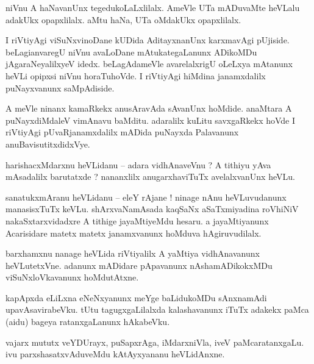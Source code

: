 \documentclass{article}
\begin{document}
\begin{mn}%
niVnu A haNavanUnx tegedukoLaLxlilalx. AmeVle UTa mADuvaMte heVLalu adakUkx opapxlilalx. aMtu haNa, 
UTa oMdakUkx opapxlilalx.
\end{mn}

\begin{mn}%
I riVtiyAgi viSuNxvinoDane kUDida AditayxnanUnx karxmavAgi pUjiside. beLagianvaregU niVnu avaLoDane 
mAtukategaLanunx ADikoMDu jAgaraNeyalilxyeV idedx. beLagAdameVle avarelalxrigU oLeLxya mAtanunx 
heVLi opipxsi niVnu horaTuhoVde. I riVtiyAgi hiMdina janamxdalilx puNayxvanunx saMpAdiside.
\end{mn}

\begin{mn}%
A meVle ninanx kamaRkekx anusAravAda sAvanUnx hoMdide. anaMtara A puNayxdiMdaleV vimAnavu baMditu. 
adaralilx kuLitu savxgaRkekx hoVde I riVtiyAgi pUvaRjanamxdalilx mADida puNayxda Palavanunx 
anuBavisutitxdidxVye.
\end{mn}

\begin{mn}%
harishacxMdarxnu heVLidanu -- adara vidhAnaveVnu ? A tithiyu yAva mAsadalilx barutatxde ? 
nananxlilx anugarxhaviTuTx avelalxvanUnx heVLu.
\end{mn}

\begin{mn}%
sanatukxmAranu heVLidanu -- eleY rAjane ! ninage nAnu heVLuvudanunx manasisxTuTx keVLu. 
shArxvaNamAsada kaqSaNx aSaTxmiyadina roVhiNiV nakaSxtarxvidadxre A tithige jayaMtiyeMdu hesaru. a 
jayaMtiyanunx Acarisidare matetx matetx janamxvanunx hoMduva hAgiruvudilalx.
\end{mn}

\begin{mn}%
barxhamxnu nanage heVLida riVtiyalilx A yaMtiya vidhAnavanunx heVLutetxVne. adanunx mADidare 
pApavanunx nAshamADikokxMDu viSuNxloVkavanunx hoMdutAtxne.
\end{mn}

\begin{mn}%
kapApxda eLiLxna eNeNxyanunx meYge baLidukoMDu sAnxnamAdi upavAsavirabeVku. tUtu tagugxgaLilalxda 
kalashavanunx iTuTx adakekx paMca (aidu) bageya ratanxgaLanunx hAkabeVku.
\end{mn}

\begin{mn}%
vajarx mututx veYDUrayx, puSapxrAga, iMdarxniVla, iveV paMcaratanxgaLu. ivu parxshasatxvAduveMdu 
kAtAyxyananu heVLidAnxne.
\end{mn}
\end{document}
